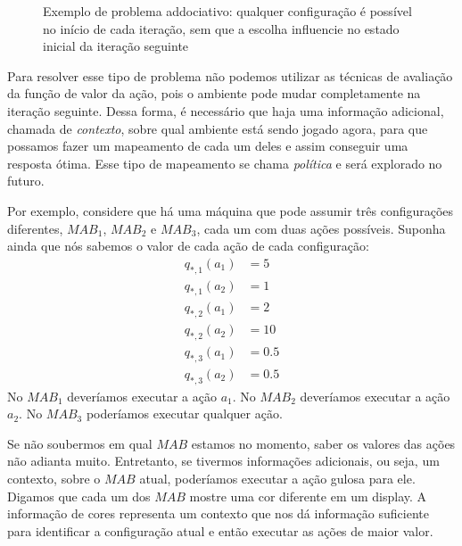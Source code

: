 \documentclass{article}
\begin{document}
            \begin{figure}
                \centering
                \associativebandits
                \caption{Exemplo de problema addociativo: qualquer configuração é possível no início de cada iteração, sem que a escolha influencie no estado inicial da iteração seguinte}
                \label{fig:my_label}
            \end{figure}
            
            Para resolver esse tipo de problema não podemos utilizar as técnicas de avaliação da função de valor da ação, pois o ambiente pode mudar completamente na iteração seguinte. Dessa forma, é necessário que haja uma informação adicional, chamada de \emph{contexto}, sobre qual ambiente está sendo jogado agora, para que possamos fazer um mapeamento de cada um deles e assim conseguir uma resposta ótima. Esse tipo de mapeamento se chama \emph{política} e será explorado no futuro.

            Por exemplo, considere que há uma máquina que pode assumir três configurações diferentes, $MAB_1$, $MAB_2$ e $MAB_3$, cada um com duas ações possíveis. Suponha ainda que nós sabemos o valor de cada ação de cada configuração:
            \begin{equation*}
            \begin{split}
                q_{*,1}(a_1) & = 5\\
                q_{*,1}(a_2) & = 1\\
                q_{*,2}(a_1) & = 2\\
                q_{*,2}(a_2) & = 10\\
                q_{*,3}(a_1) & = 0.5\\
                q_{*,3}(a_2) & = 0.5
            \end{split}
            \end{equation*}
            No $MAB_1$ deveríamos executar a ação $a_1$. No $MAB_2$ deveríamos executar a ação $a_2$. No $MAB_3$ poderíamos executar qualquer ação.
            
            Se não soubermos em qual $MAB$ estamos no momento, saber os valores das ações não adianta muito. Entretanto, se tivermos informações adicionais, ou seja, um contexto, sobre o $MAB$ atual, poderíamos executar a ação gulosa para ele. Digamos que cada um dos $MAB$ mostre uma cor diferente em um display. A informação de cores representa um contexto que nos dá informação suficiente para identificar a configuração atual e então executar as ações de maior valor.
            
\end{document}
